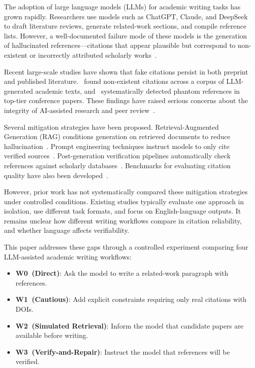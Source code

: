 \documentclass[11pt,a4paper]{article}
\newcommand{\wzero}{W0~}
\newcommand{\wone}{W1~}
\newcommand{\wtwo}{W2~}
\newcommand{\wthree}{W3~}
\begin{document}
The adoption of large language models (LLMs) for academic writing tasks has grown rapidly. Researchers use models such as ChatGPT, Claude, and DeepSeek to draft literature reviews, generate related-work sections, and compile reference lists. However, a well-documented failure mode of these models is the generation of hallucinated references---citations that appear plausible but correspond to non-existent or incorrectly attributed scholarly works~\cite{zuccon2023hallucinates, walters2023fabrication, athaluri2023boundaries}.

Recent large-scale studies have shown that fake citations persist in both preprint and published literature.~\cite{zhao2026hallucinations} found non-existent citations across a corpus of LLM-generated academic texts, and~\cite{russinovich2026phantom} systematically detected phantom references in top-tier conference papers. These findings have raised serious concerns about the integrity of AI-assisted research and peer review~\cite{ansari2026compound}.

Several mitigation strategies have been proposed. Retrieval-Augmented Generation (RAG) conditions generation on retrieved documents to reduce hallucination~\cite{lewis2020rag, asai2023selfrag}. Prompt engineering techniques instruct models to only cite verified sources~\cite{glynn2025guarding}. Post-generation verification pipelines automatically check references against scholarly databases~\cite{yuan2026citeaudit, abbonato2026checkifexist}. Benchmarks for evaluating citation quality have also been developed~\cite{tilwani2024reasons, friel2024ragbench}.

However, prior work has not systematically compared these mitigation strategies under controlled conditions. Existing studies typically evaluate one approach in isolation, use different task formats, and focus on English-language outputs. It remains unclear how different writing workflows compare in citation reliability, and whether language affects verifiability.

This paper addresses these gaps through a controlled experiment comparing four LLM-assisted academic writing workflows:

\begin{itemize}[nosep]
    \item \textbf{\wzero (Direct)}: Ask the model to write a related-work paragraph with references.
    \item \textbf{\wone (Cautious)}: Add explicit constraints requiring only real citations with DOIs.
    \item \textbf{\wtwo (Simulated Retrieval)}: Inform the model that candidate papers are available before writing.
    \item \textbf{\wthree (Verify-and-Repair)}: Instruct the model that references will be verified.
\end{itemize}
\end{document}
